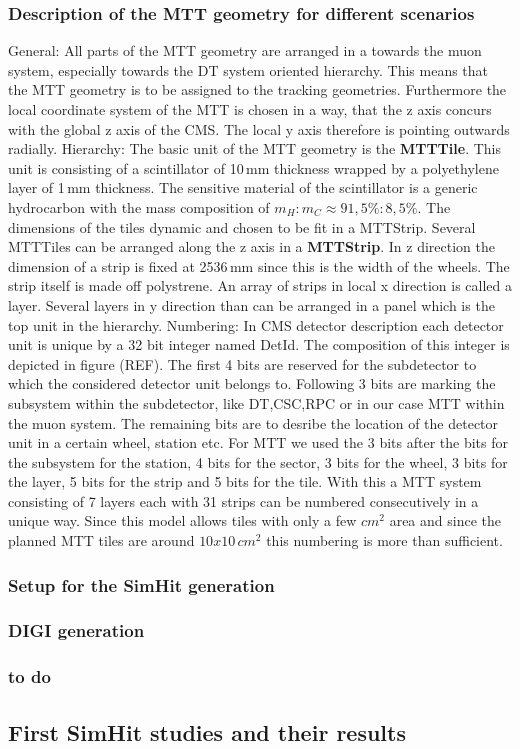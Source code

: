 \subsubsection{Description of the MTT geometry for different scenarios}
	General:
	All parts of the MTT geometry are arranged in a towards the muon system, especially towards the DT system oriented hierarchy.
	This means that the MTT geometry is to be assigned to the tracking geometries.
	Furthermore the local coordinate system of the MTT is chosen in a way, that the z axis concurs with the global z axis of the CMS.
	The local y axis therefore is pointing outwards radially.
	Hierarchy:
	The basic unit of the MTT geometry is the \textbf{MTTTile}.
	This unit is consisting of a scintillator of 10\,mm thickness wrapped by a polyethylene layer of 1\,mm thickness.
	The sensitive material of the scintillator is a generic hydrocarbon with the mass composition of $m_H:m_C \approx 91,5\%:8,5\%$. 
	The dimensions of the tiles dynamic and chosen to be fit in a MTTStrip.
	Several MTTTiles can be arranged along the z axis in a \textbf{MTTStrip}.
	In z direction the dimension of a strip is fixed at 2536\,mm since this is the width of the wheels. 
	The strip itself is made off polystrene.
	An array of strips in local x direction is called a layer.
	Several layers in y direction than can be arranged in a panel which is the top unit in the hierarchy.
	Numbering:
	In CMS detector description each detector unit is unique by a 32 bit integer named DetId.
	The composition of this integer is depicted in figure (REF).
	The first 4 bits are reserved for the subdetector to which the considered detector unit belongs to.
	Following 3 bits are marking the subsystem within the subdetector, like DT,CSC,RPC or in our case MTT within the muon system.
	The remaining bits are to desribe the location of the detector unit in a certain wheel, station etc.
	For MTT we used the 3 bits after the bits for the subsystem for the station, 4 bits for the sector, 3 bits for the wheel, 3 bits for the layer, 5 bits for the strip and 5 bits for the tile.
	With this a MTT system consisting of 7 layers each with 31 strips can be numbered consecutively in a unique way.
	Since this model allows tiles with only a few $cm^2$ area and since the planned MTT tiles are around $10x10\,cm^2$ this numbering is more than sufficient. 
\subsubsection{Setup for the SimHit generation}
\subsubsection{DIGI generation}
\subsubsection{to do}
\subsection{First SimHit studies and their results}
